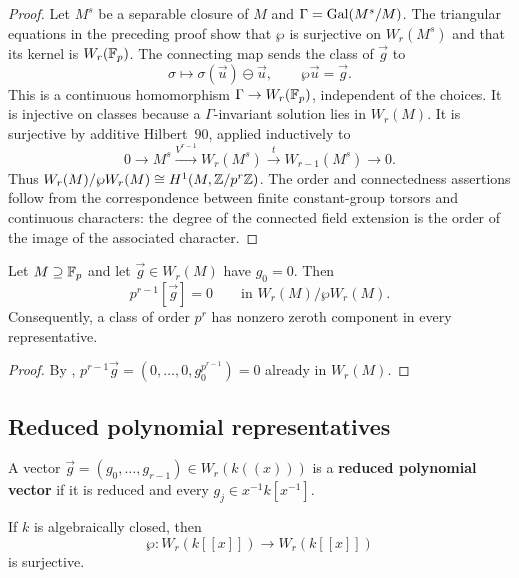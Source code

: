 \begin{proof}
Let $M^s$ be a separable closure of $M$ and
$\Gamma=\operatorname{Gal}(M^s/M)$. The triangular equations in the preceding proof show
that $\wp$ is surjective on $W_r(M^s)$ and that its kernel is
$W_r(\mathbb{F}_p)$. The connecting map sends the class of $\vec g$ to
\[
\sigma\longmapsto\sigma(\vec u)\ominus\vec u,
\qquad \wp\vec u=\vec g.
\]
This is a continuous homomorphism $\Gamma\to W_r(\mathbb{F}_p)$, independent of
the choices. It is injective on classes because a $\Gamma$-invariant solution
lies in $W_r(M)$. It is surjective by additive Hilbert~90, applied inductively
to
\[
0\longrightarrow M^s\xrightarrow{V^{r-1}}W_r(M^s)
\xrightarrow{t}W_{r-1}(M^s)\longrightarrow0.
\]
Thus $W_r(M)/\wp W_r(M)\cong H^1(M,\mathbb{Z}/p^r\mathbb{Z})$. The order and
connectedness assertions follow from the correspondence between finite
constant-group torsors and continuous characters: the degree of the connected
field extension is the order of the image of the associated character.
\end{proof}

\begin{cor}\label{cor:asw_class_order_and_first_component}
Let $M\supseteq\mathbb{F}_p$ and let $\vec g\in W_r(M)$ have $g_0=0$. Then
\[
p^{r-1}[\vec g]=0 \qquad\text{in } W_r(M)/\wp W_r(M).
\]
Consequently, a class of
order $p^r$ has nonzero zeroth component in every representative.
\end{cor}

\begin{proof}
By ,
$p^{r-1}\vec g=(0,\dots,0,g_0^{p^{r-1}})=0$ already in $W_r(M)$.
\end{proof}

\subsection{Reduced polynomial representatives}

\begin{definition}\label{definition:reduced_polynomial_vector}
A vector $\vec g=(g_0,\dots,g_{r-1})\in W_r(k((x)))$ is a
\textbf{reduced polynomial vector} if it is reduced and every
$g_j\in x^{-1}k[x^{-1}]$.
\end{definition}

\begin{lemma}
\label{lemma:wp_surjective_on_integral_witt}
If $k$ is algebraically closed, then
\[
\wp:W_r(k[[x]])\longrightarrow W_r(k[[x]])
\]
is surjective.
\end{lemma}


